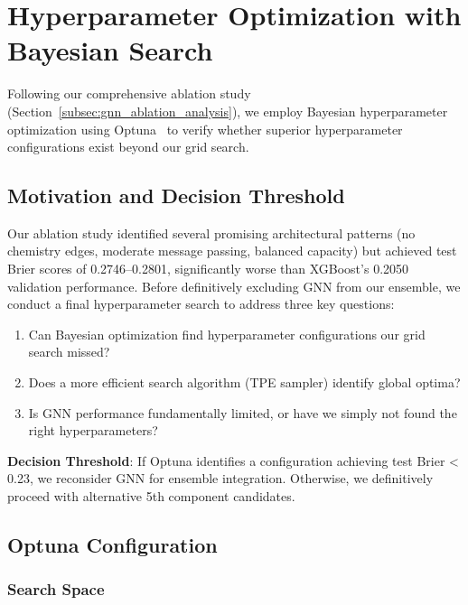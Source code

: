 \section{Hyperparameter Optimization with Bayesian Search}
\label{sec:gnn_optuna_search}

Following our comprehensive ablation study (Section~\ref{subsec:gnn_ablation_analysis}), we employ Bayesian hyperparameter optimization using Optuna~\citep{akiba2019optuna} to verify whether superior hyperparameter configurations exist beyond our grid search.

\subsection{Motivation and Decision Threshold}
\label{subsec:optuna_motivation}

Our ablation study identified several promising architectural patterns (no chemistry edges, moderate message passing, balanced capacity) but achieved test Brier scores of 0.2746--0.2801, significantly worse than XGBoost's 0.2050 validation performance. Before definitively excluding GNN from our ensemble, we conduct a final hyperparameter search to address three key questions:

\begin{enumerate}[noitemsep]
    \item Can Bayesian optimization find hyperparameter configurations our grid search missed?
    \item Does a more efficient search algorithm (TPE sampler) identify global optima?
    \item Is GNN performance fundamentally limited, or have we simply not found the right hyperparameters?
\end{enumerate}

\textbf{Decision Threshold}: If Optuna identifies a configuration achieving test Brier < 0.23, we reconsider GNN for ensemble integration. Otherwise, we definitively proceed with alternative 5th component candidates.

\subsection{Optuna Configuration}
\label{subsec:optuna_configuration}

\subsubsection{Search Space}


